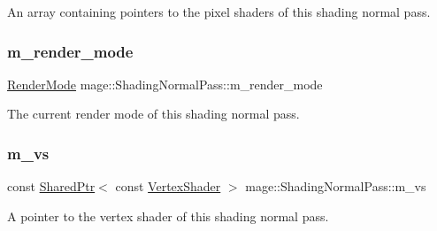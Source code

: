 An array containing pointers to the pixel shaders of this shading normal pass. \hypertarget{classmage_1_1_shading_normal_pass_a0048886bc80b9b39c1dc5d17e5b68584}{}\label{classmage_1_1_shading_normal_pass_a0048886bc80b9b39c1dc5d17e5b68584} 
\subsubsection{\texorpdfstring{m\+\_\+render\+\_\+mode}{m\_render\_mode}}
{\footnotesize\ttfamily \hyperlink{namespacemage_a5e7e18b0154373ce8fc942fe3f6b27fd}{Render\+Mode} mage\+::\+Shading\+Normal\+Pass\+::m\+\_\+render\+\_\+mode\hspace{0.3cm}{\ttfamily [private]}}

The current render mode of this shading normal pass. \hypertarget{classmage_1_1_shading_normal_pass_a75c60d2d17deb2b87d97a094e4be7aa1}{}\label{classmage_1_1_shading_normal_pass_a75c60d2d17deb2b87d97a094e4be7aa1} 
\subsubsection{\texorpdfstring{m\+\_\+vs}{m\_vs}}
{\footnotesize\ttfamily const \hyperlink{namespacemage_a1e01ae66713838a7a67d30e44c67703e}{Shared\+Ptr}$<$ const \hyperlink{classmage_1_1_vertex_shader}{Vertex\+Shader} $>$ mage\+::\+Shading\+Normal\+Pass\+::m\+\_\+vs\hspace{0.3cm}{\ttfamily [private]}}

A pointer to the vertex shader of this shading normal pass. 